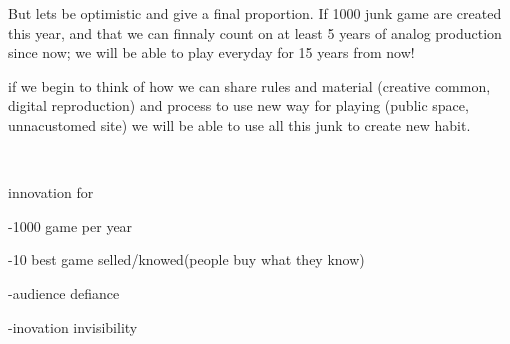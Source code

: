 But let{\textquotesingle}s be optimistic and give a final proportion. If
1000 junk game are created this year, and that we can finnaly count on
at least 5 years of analog production since now; we will be able to
play everyday for 15 years from now!

if we begin to think of how we can share rules and material (creative
common, digital reproduction) and process to use new way for playing
(public space, unnacustomed site) we will be able to use all this junk
to create new habit. ~ ~

~

innovation for ~ ~ ~ ~ ~ ~~

{}-1000 game per year

{}-10 best game selled/knowed(people buy what they know)

{}-audience defiance

{}-inovation invisibility
